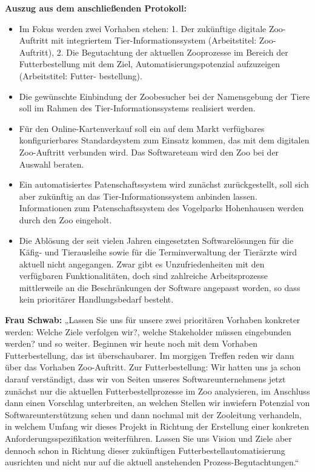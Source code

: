 \textbf{Auszug aus dem anschließenden Protokoll:}
\begin{itemize}
	\item Im Fokus werden zwei Vorhaben stehen: 1. Der zukünftige digitale Zoo-Auftritt mit integriertem Tier-Informationssystem (Arbeitstitel: Zoo-Auftritt), 2. Die Begutachtung der aktuellen Zooprozesse im Bereich der Futterbestellung mit dem Ziel, Automatisierungspotenzial aufzuzeigen (Arbeitstitel: Futter-
	\linebreak %
	bestellung).
	\item Die gewünschte Einbindung der Zoobesucher bei der Namensgebung der Tiere soll im Rahmen des Tier-Informationssystems realisiert werden.
	\item Für den Online-Kartenverkauf soll ein auf dem Markt verfügbares konfigurierbares Standardsystem zum Einsatz kommen, das mit dem digitalen Zoo-Auftritt verbunden wird. Das Softwareteam wird den Zoo bei der Auswahl beraten.
	\item Ein automatisiertes Patenschaftssystem wird zunächst zurückgestellt, soll sich aber zukünftig an das Tier-Informationssystem anbinden lassen. Informationen zum Patenschaftssystem des Vogelparks Hohenhausen werden durch den Zoo eingeholt.
	\item Die Ablösung der seit vielen Jahren eingesetzten Softwarelösungen für die Käfig- und Tierausleihe sowie für die Terminverwaltung der Tierärzte wird aktuell nicht angegangen. Zwar gibt es Unzufriedenheiten mit den verfüg\-baren Funktionalitäten, doch sind zahlreiche Arbeitsprozesse mittlerweile an die Beschränkungen der Software angepasst worden, so dass kein prioritärer Handlungsbedarf besteht. 
\end{itemize}

\textbf{Frau Schwab:} „Lassen Sie uns für unsere zwei prioritären Vorhaben konkreter werden: Welche Ziele verfolgen wir?, welche Stakeholder müssen eingebunden werden? und so weiter. Beginnen wir heute noch mit dem Vorhaben Futterbestellung, das ist überschaubarer. Im morgigen Treffen reden wir dann über das Vorhaben Zoo-Auftritt. Zur Futterbestellung: Wir hatten uns ja schon darauf verständigt, dass wir von Seiten unseres Softwareunternehmens jetzt zunächst nur die aktuellen Futter\-bestell\-prozesse im Zoo analysieren, im Anschluss dann einen Vorschlag unterbreiten, an welchen Stellen wir inwiefern Potenzial von Softwareunterstützung sehen und dann nochmal mit der Zooleitung verhandeln, in welchem Umfang wir dieses Projekt in Richtung der Erstellung einer konkreten Anforderungsspezifikation weiterführen. Lassen Sie uns Vision und Ziele aber dennoch schon in Richtung dieser zukünftigen Futterbestellautomatisierung ausrichten und nicht nur auf die aktuell anstehenden Prozess-Begutachtungen.“

